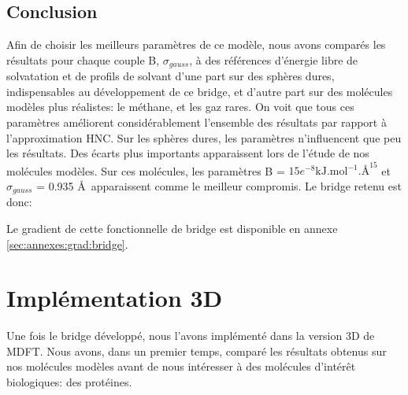 \subsection{Conclusion}
Afin de choisir les meilleurs paramètres de ce modèle, nous avons comparés les résultats pour chaque couple B, $\sigma_{gauss}$, à des références d'énergie libre de solvatation et de profils de solvant d'une part sur des sphères dures, indispensables au développement de ce bridge, et d'autre part sur des molécules modèles plus réalistes: le méthane, et les gaz rares.
On voit que tous ces paramètres améliorent considérablement l'ensemble des résultats par rapport à l'approximation HNC. Sur les sphères dures, les paramètres n'influencent que peu les résultats. Des écarts plus importants apparaissent lors de l'étude de nos molécules modèles. Sur ces molécules, les paramètres B = $15e^{-8} \mathrm{kJ.mol}^{-1}.\text{\AA}^{15}$ et $\sigma_{gauss}$ = 0.935 \AA\ apparaissent comme le meilleur compromis. Le bridge retenu est donc:


Le gradient de cette fonctionnelle de bridge est disponible en annexe \ref{sec:annexes:grad:bridge}.

\section{Implémentation 3D}
Une fois le bridge développé, nous l'avons implémenté dans la version 3D de MDFT. Nous avons, dans un premier temps, comparé les résultats obtenus sur nos molécules modèles avant de nous intéresser à des molécules d’intérêt biologiques: des protéines.


